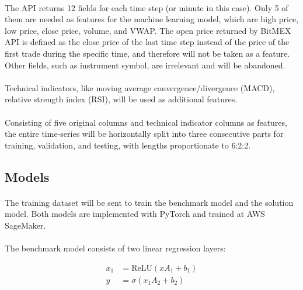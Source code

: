 \documentclass[12pt, letterpaper]{article}
\begin{document}
\paragraph{}
The API returns 12 fields for each time step (or minute in this case). Only 5 of them are needed as features for the machine learning model, which are high price, low price, close price, volume, and VWAP. The open price returned by BitMEX API is defined as the close price of the last time step instead of the price of the first trade during the specific time, and therefore will not be taken as a feature. Other fields, such as instrument symbol, are irrelevant and will be abandoned.

\paragraph{}
Technical indicators, like moving average convergence/divergence (MACD), relative strength index (RSI), will be used as additional features.

\paragraph{}
Consisting of five original columns and technical indicator columns as features, the entire time-series will be horizontally split into three consecutive parts for training, validation, and testing, with lengths proportionate to 6:2:2.

\subsection{Models}

\paragraph{}
The training dataset will be sent to train the benchmark model and the solution model. Both models are implemented with PyTorch and trained at AWS SageMaker.

\paragraph{}
The benchmark model consists of two linear regression layers:

\begin{align*}
    x_1&=\mathrm{ReLU}(xA_1+b_1) \\
    y&=\sigma(x_1A_2+b_2)
\end{align*}
\end{document}
